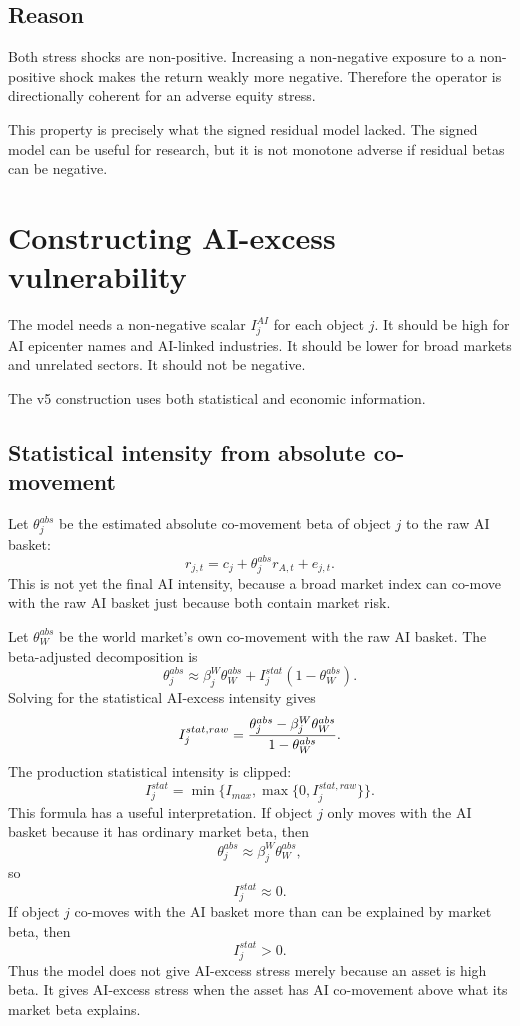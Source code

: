 \documentclass[11pt]{article}
\begin{document}
\subsection*{Reason}

Both stress shocks are non-positive. Increasing a non-negative exposure to a non-positive shock makes the return weakly more negative. Therefore the operator is directionally coherent for an adverse equity stress.

This property is precisely what the signed residual model lacked. The signed model can be useful for research, but it is not monotone adverse if residual betas can be negative.

\section{Constructing AI-excess vulnerability}

The model needs a non-negative scalar $I_j^{AI}$ for each object $j$. It should be high for AI epicenter names and AI-linked industries. It should be lower for broad markets and unrelated sectors. It should not be negative.

The v5 construction uses both statistical and economic information.

\subsection{Statistical intensity from absolute co-movement}

Let $\theta_j^{abs}$ be the estimated absolute co-movement beta of object $j$ to the raw AI basket:
\[
r_{j,t}=c_j+\theta_j^{abs}r_{A,t}+e_{j,t}.
\]
This is not yet the final AI intensity, because a broad market index can co-move with the raw AI basket just because both contain market risk.

Let $\theta_W^{abs}$ be the world market's own co-movement with the raw AI basket. The beta-adjusted decomposition is
\[
\theta_j^{abs}\approx \beta_j^W\theta_W^{abs}+I_j^{stat}(1-\theta_W^{abs}).
\]
Solving for the statistical AI-excess intensity gives
\[
I_j^{stat,raw}
=
{\theta_j^{abs}-\beta_j^W\theta_W^{abs}\over 1-\theta_W^{abs}}.
\]
The production statistical intensity is clipped:
\[
I_j^{stat}=\min\{I_{max},\max\{0,I_j^{stat,raw}\}\}.
\]
This formula has a useful interpretation. If object $j$ only moves with the AI basket because it has ordinary market beta, then
\[
\theta_j^{abs}\approx \beta_j^W\theta_W^{abs},
\]
so
\[
I_j^{stat}\approx 0.
\]
If object $j$ co-moves with the AI basket more than can be explained by market beta, then
\[
I_j^{stat}>0.
\]
Thus the model does not give AI-excess stress merely because an asset is high beta. It gives AI-excess stress when the asset has AI co-movement above what its market beta explains.
\end{document}
